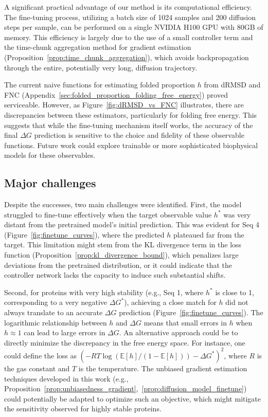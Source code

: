 \documentclass{article}
\theoremstyle{plain}
\theoremstyle{definition}
\theoremstyle{remark}
\begin{document}
A significant practical advantage of our method is its computational efficiency. The fine-tuning process, utilizing a batch size of 1024 samples and 200 diffusion steps per sample, can be performed on a single NVIDIA H100 GPU with 80GB of memory. This efficiency is largely due to the use of a small controller term and the time-chunk aggregation method for gradient estimation (Proposition~\ref{prop:time_chunk_aggregation}), which avoids backpropagation through the entire, potentially very long, diffusion trajectory.

The current naive functions for estimating folded proportion $h$ from dRMSD and FNC (Appendix~\ref{sec:folded_proportion_folding_free_energy}) proved serviceable. However, as Figure~\ref{fig:dRMSD_vs_FNC} illustrates, there are discrepancies between these estimators, particularly for folding free energy. This suggests that while the fine-tuning mechanism itself works, the accuracy of the final $\Delta G$ prediction is sensitive to the choice and fidelity of these observable functions. Future work could explore trainable or more sophisticated biophysical models for these observables.

\subsection{Major challenges}

Despite the successes, two main challenges were identified. First, the model struggled to fine-tune effectively when the target observable value $h^*$ was very distant from the pretrained model's initial prediction. This was evident for Seq 4 (Figure~\ref{fig:finetune_curves}), where the predicted $h$ plateaued far from the target. This limitation might stem from the KL divergence term in the loss function (Proposition~\ref{prop:kl_divergence_bound}), which penalizes large deviations from the pretrained distribution, or it could indicate that the controller network lacks the capacity to induce such substantial shifts.

Second, for proteins with very high stability (e.g., Seq 1, where $h^*$ is close to 1, corresponding to a very negative $\Delta G^*$), achieving a close match for $h$ did not always translate to an accurate $\Delta G$ prediction (Figure~\ref{fig:finetune_curves}). The logarithmic relationship between $h$ and $\Delta G$ means that small errors in $h$ when $h \approx 1$ can lead to large errors in $\Delta G$. An alternative approach could be to directly minimize the discrepancy in the free energy space. For instance, one could define the loss as $(-RT\log(\mathbb{E}[h]/(1-\mathbb{E}[h])) - \Delta G^*)^2$, where $R$ is the gas constant and $T$ is the temperature. The unbiased gradient estimation techniques developed in this work (e.g., Proposition~\ref{prop:unbiasedness_gradient},~\ref{prop:diffusion_model_finetune}) could potentially be adapted to optimize such an objective, which might mitigate the sensitivity observed for highly stable proteins.
\end{document}
